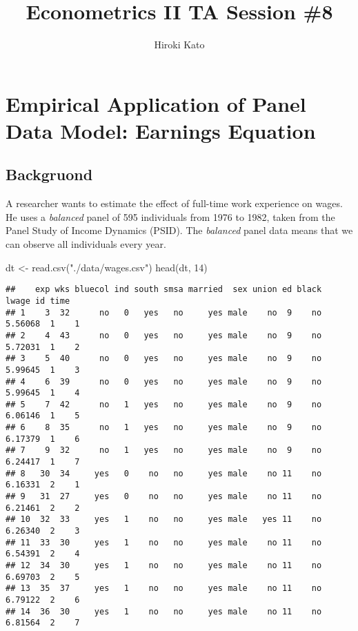 \documentclass[
  12pt,
]{article}
\title{Econometrics II TA Session \#8}
\author{Hiroki Kato}
\date{}
\newenvironment{Shaded}{\begin{snugshade}}{\end{snugshade}}
\newcommand{\DecValTok}[1]{\textcolor[rgb]{0.00,0.00,0.81}{#1}}
\newcommand{\FunctionTok}[1]{\textcolor[rgb]{0.00,0.00,0.00}{#1}}
\newcommand{\NormalTok}[1]{#1}
\newcommand{\OtherTok}[1]{\textcolor[rgb]{0.56,0.35,0.01}{#1}}
\newcommand{\StringTok}[1]{\textcolor[rgb]{0.31,0.60,0.02}{#1}}
\begin{document}
\maketitle

\hypertarget{empirical-application-of-panel-data-model-earnings-equation}{%
\section{Empirical Application of Panel Data Model: Earnings
Equation}\label{empirical-application-of-panel-data-model-earnings-equation}}

\hypertarget{backgruond}{%
\subsection{Backgruond}\label{backgruond}}

A researcher wants to estimate the effect of full-time work experience
on wages. He uses a \emph{balanced} panel of 595 individuals from 1976
to 1982, taken from the Panel Study of Income Dynamics (PSID). The
\emph{balanced} panel data means that we can observe all individuals
every year.

\begin{Shaded}
\begin{Highlighting}[]
\NormalTok{dt }\OtherTok{\textless{}{-}} \FunctionTok{read.csv}\NormalTok{(}\StringTok{"./data/wages.csv"}\NormalTok{)}
\FunctionTok{head}\NormalTok{(dt, }\DecValTok{14}\NormalTok{)}
\end{Highlighting}
\end{Shaded}

\begin{verbatim}
##    exp wks bluecol ind south smsa married  sex union ed black   lwage id time
## 1    3  32      no   0   yes   no     yes male    no  9    no 5.56068  1    1
## 2    4  43      no   0   yes   no     yes male    no  9    no 5.72031  1    2
## 3    5  40      no   0   yes   no     yes male    no  9    no 5.99645  1    3
## 4    6  39      no   0   yes   no     yes male    no  9    no 5.99645  1    4
## 5    7  42      no   1   yes   no     yes male    no  9    no 6.06146  1    5
## 6    8  35      no   1   yes   no     yes male    no  9    no 6.17379  1    6
## 7    9  32      no   1   yes   no     yes male    no  9    no 6.24417  1    7
## 8   30  34     yes   0    no   no     yes male    no 11    no 6.16331  2    1
## 9   31  27     yes   0    no   no     yes male    no 11    no 6.21461  2    2
## 10  32  33     yes   1    no   no     yes male   yes 11    no 6.26340  2    3
## 11  33  30     yes   1    no   no     yes male    no 11    no 6.54391  2    4
## 12  34  30     yes   1    no   no     yes male    no 11    no 6.69703  2    5
## 13  35  37     yes   1    no   no     yes male    no 11    no 6.79122  2    6
## 14  36  30     yes   1    no   no     yes male    no 11    no 6.81564  2    7
\end{verbatim}
\end{document}
